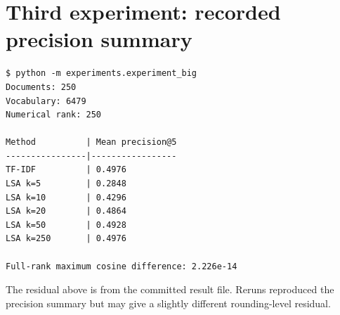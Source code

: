 \documentclass[12pt,a4paper]{report}
\theoremstyle{plain}
\theoremstyle{definition}
\theoremstyle{remark}
\theoremstyle{definition}
\begin{document}
\section{Third experiment: recorded precision summary}
\begin{verbatim}
$ python -m experiments.experiment_big
Documents: 250
Vocabulary: 6479
Numerical rank: 250

Method          | Mean precision@5
----------------|-----------------
TF-IDF          | 0.4976
LSA k=5         | 0.2848
LSA k=10        | 0.4296
LSA k=20        | 0.4864
LSA k=50        | 0.4928
LSA k=250       | 0.4976

Full-rank maximum cosine difference: 2.226e-14
\end{verbatim}
The residual above is from the committed result file. Reruns reproduced the precision summary but may give a slightly different rounding-level residual.
\end{document}
